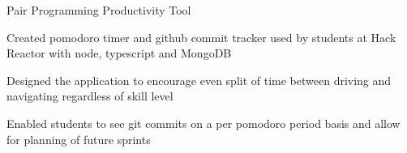 \begin{cventries}
  \cventry
    {} %
    {Pair Programming Productivity Tool} %
    {} %
    {} %
    {
      \begin{cvitems} %
      	\item {Created pomodoro timer and github commit tracker used by students at Hack Reactor with node, typescript and MongoDB}
        \item {Designed the application to encourage even split of time between driving and navigating regardless of skill level}
        \item {Enabled students to see git commits on a per pomodoro period basis and allow for planning of future sprints}
      \end{cvitems}
    }
\end{cventries}
